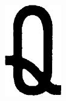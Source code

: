 \documentclass[times, zavrsni, numeric, utf8]{fer}
\begin{document}
\begin{figure}[H]
\begin{subfigure}[b]{0.14\textwidth}
					\includegraphics[width=\textwidth]{templates-rank/image25.png}
					\caption{}
				\end{subfigure}
				\begin{subfigure}[b]{0.15\textwidth}
					\centering

\end{subfigure}
\end{figure}
\end{document}
